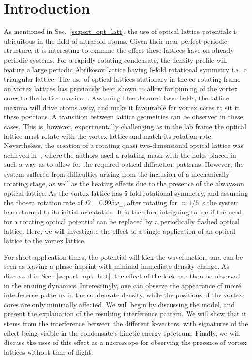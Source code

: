 \section{Introduction}

As mentioned in Sec.~\ref{ss:pert_opt_latt}, the use of optical lattice potentials is ubiquitous in the field of ultracold atoms. Given their near perfect periodic structure, it is interesting to examine the effect these lattices have on already periodic systems. For a rapidly rotating condensate, the density profile will feature a large periodic Abrikosov lattice having $6$-fold rotational symmetry i.e.\ a triangular lattice. The use of optical lattices stationary in the co-rotating frame on vortex lattices has previously been shown to allow for pinning of the vortex cores to the lattice maxima \cite{OL:Reijnders_prl_2004,Vtx:Tung_prl_2006}. Assuming blue detuned laser fields, the lattice maxima will drive atoms away, and make it favourable for vortex cores to sit in these positions. A transition between lattice geometries can be observed in these cases. This is, however, experimentally challenging as in the lab frame the optical lattice must rotate with the vortex lattice and match its rotation rate. Nevertheless, the creation of a rotating quasi two-dimensional optical lattice was achieved in~\cite{Vtx:Tung_prl_2006}, where the authors used a rotating mask with the holes placed in such a way as to allow for the required optical diffraction patterns. However, the system suffered from difficulties arising from the inclusion of a mechanically rotating stage, as well as the heating effects due to the presence of the always-on optical lattice. As the vortex lattice has 6-fold rotational symmetry, and assuming the chosen rotation rate of $\Omega = 0.995\omega_\perp$, after rotating for
$ \approx 1/6$\ s the system has returned to its initial orientation. It is therefore intriguing to see if the need for a rotating optical potential can be replaced by a periodically flashed optical lattice. Here, we will investigate the effect of a single application of an optical lattice to the vortex lattice.

 For short application times, the potential will kick the wavefunction, and can be seen as leaving a phase imprint with minimal immediate density change. As discussed in Sec.~\ref{ss:pert_opt_latt}, the effect of the kick can then be observed in the ensuing dynamics. Interestingly, one can observe the appearance of moir\'e interference patterns in the condensate density, while the positions of the vortex cores are only minimally affected. We will begin by discussing the model, and present the explanation of the resulting interference pattern. We will show that it stems from the interference between the different $\mathbf{k}$-vectors, with signatures of the effect being visible in the condensate's kinetic energy spectrum. Finally, we will discuss the uses of this effect as a microscope for observing the presence of vortex lattices without time-of-flight.

